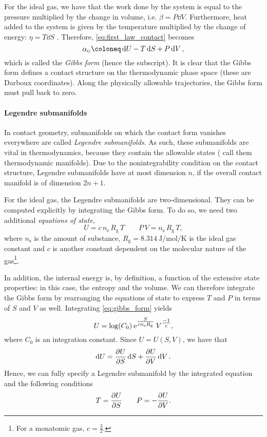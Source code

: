 For the ideal gas, we have that the work done by the system is equal to the pressure multiplied by the change in volume, i.e. \(\beta = P\dd{V}\). Furthermore, heat added to the system is given by the temperature multiplied by the change of energy: \(\eta = T\dd{S}\) \cite{Arnold1989b,Wightman1979,Bamberg1988}. Therefore, \cref{eq:first_law_contact} becomes
\begin{equation}
    \alpha_\text{\tiny G} \coloneq \dd{U} - T\dd{S} + P\dd{V},
    \label{eq:gibbs_form}
\end{equation}
which is called the \emph{Gibbs form} (hence the subscript). It is clear that the Gibbs form defines a contact structure on the thermodynamic phase space (these are Darboux coordinates). Along the physically allowable trajectories, the Gibbs form must pull back to zero.

\paragraph{Legendre submanifolds} In contact geometry, submanifolds on which the contact form vanishes everywhere are called \emph{Legendre submanifolds}. As such, these submanifolds are vital in thermodynamics, because they contain the allowable states (\citet{Balian2001} call them thermodynamic manifolds). Due to the nonintegrability condition on the contact structure, Legendre submanifolds have at most dimension \(n\), if the overall contact manifold is of dimension \(2n + 1\).

For the ideal gas, the Legendre submanifolds are two-dimensional. They can be computed explicitly by integrating the Gibbs form. To do so, we need two additional \emph{equations of state}, 
\begin{equation}
    U = c\, n_\text{s}\, R_\text{g}\, T \qquad P \, V = n_\text{s} \, R_\text{g} \, T,
\end{equation}
where \(n_\text{s}\) is the amount of substance, \(R_\text{g} = \SI{8.314}{\joule \per \mole \per \kelvin}\) is the ideal gas constant and \(c\) is another constant dependent on the molecular nature of the gas\footnote{For a monatomic gas, \(c = \tfrac{3}{2}\).}. 

In addition, the internal energy is, by definition, a function of the extensive state properties: in this case, the entropy and the volume. We can therefore integrate the Gibbs form by rearranging the equations of state to express \(T\) and \(P\) in terms of \(S\) and \(V\) as well. Integrating \cref{eq:gibbs_form} yields
\begin{equation}
     U = \log(C_0) \: \mathrm{e}^{\tfrac{S}{cn_\text{s}R_\text{g}}} \: V^{\tfrac{-1}{c}},
\end{equation}
where \(C_0\) is an integration constant. Since \( U = U(S, V)\), we have that
\begin{equation}
     \dd{U} = \pdv{U}{S}\dd{S} + \pdv{U}{V}\dd{V}.
\end{equation}
Hence, we can fully specify a Legendre submanifold by the integrated equation and the following conditions
\begin{equation}
     T = \pdv{U}{S} \qquad P = -\pdv{U}{V}.
\end{equation}

